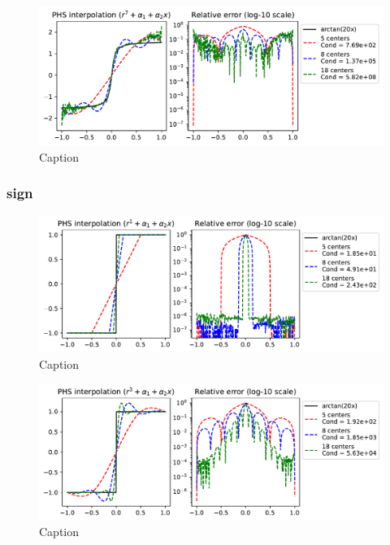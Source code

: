 \documentclass[12pt]{report} %
\begin{document}
\begin{figure}[ht]
    \centering
    \includegraphics[width=\textwidth]{imagenes/phs_interpolation/arctan20x_r7_deg1.pdf}
    \caption{Caption}
    \label{fig:arctan20x-r7-deg1}
\end{figure}

\subsubsection{sign}

\begin{figure}[ht]
    \centering
    \includegraphics[width=\textwidth]{imagenes/phs_interpolation/sign_r1_deg1.pdf}
    \caption{Caption}
    \label{fig:sign-r1-deg1}
\end{figure}

\begin{figure}[ht]
    \centering
    \includegraphics[width=\textwidth]{imagenes/phs_interpolation/sign_r3_deg1.pdf}
    \caption{Caption}
    \label{fig:sign-r3-deg1}
\end{figure}
\end{document}
